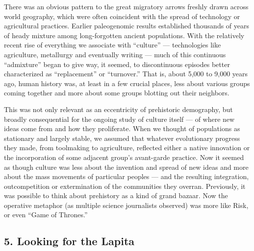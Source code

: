 There was an obvious pattern to the great migratory arrows freshly drawn
across world geography, which were often coincident with the spread of
technology or agricultural practices. Earlier paleogenomic results
established thousands of years of heady mixture among long-forgotten
ancient populations. With the relatively recent rise of everything we
associate with ``culture'' --- technologies like agriculture, metallurgy
and eventually writing --- much of this continuous ``admixture'' began
to give way, it seemed, to discontinuous episodes better characterized
as ``replacement'' or ``turnover.'' That is, about 5,000 to 9,000 years
ago, human history was, at least in a few crucial places, less about
various groups coming together and more about some groups blotting out
their neighbors.

This was not only relevant as an eccentricity of prehistoric demography,
but broadly consequential for the ongoing study of culture itself --- of
where new ideas come from and how they proliferate. When we thought of
populations as stationary and largely stable, we assumed that whatever
evolutionary progress they made, from toolmaking to agriculture,
reflected either a native innovation or the incorporation of some
adjacent group's avant-garde practice. Now it seemed as though culture
was less about the invention and spread of new ideas and more about the
mass movements of particular peoples --- and the resulting integration,
outcompetition or extermination of the communities they overran.
Previously, it was possible to think about prehistory as a kind of grand
bazaar. Now the operative metaphor (as multiple science journalists
observed) was more like Risk, or even ``Game of Thrones.''

\hypertarget{5-looking-for-the-lapita}{%
\subsection{\texorpdfstring{\textbf{5. Looking for the
Lapita}}{5. Looking for the Lapita}}\label{5-looking-for-the-lapita}}


